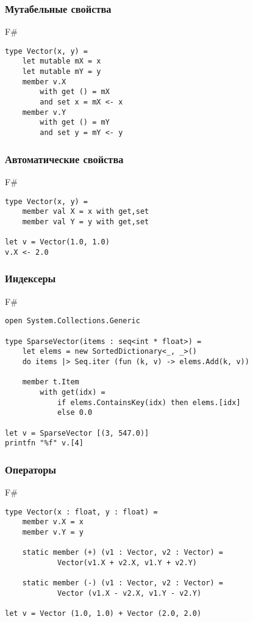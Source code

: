 \documentclass[xetex,mathserif,serif]{beamer}
\begin{document}
	\begin{frame}[fragile]
		\frametitle{Мутабельные свойства}
		\begin{exampleblock}{F\#}
			\begin{verbatim}
type Vector(x, y) = 
    let mutable mX = x
    let mutable mY = y
    member v.X 
        with get () = mX
        and set x = mX <- x
    member v.Y
        with get () = mY
        and set y = mY <- y
			\end{verbatim}
		\end{exampleblock}
\end{frame}

	\begin{frame}[fragile]
		\frametitle{Автоматические свойства}
		\begin{exampleblock}{F\#}
			\begin{verbatim}
type Vector(x, y) = 
    member val X = x with get,set
    member val Y = y with get,set

let v = Vector(1.0, 1.0)
v.X <- 2.0
			\end{verbatim}
		\end{exampleblock}
\end{frame}

	\begin{frame}[fragile]
		\frametitle{Индексеры}
		\begin{exampleblock}{F\#}
			\begin{verbatim}
open System.Collections.Generic

type SparseVector(items : seq<int * float>) =
    let elems = new SortedDictionary<_, _>()
    do items |> Seq.iter (fun (k, v) -> elems.Add(k, v))

    member t.Item
        with get(idx) =
            if elems.ContainsKey(idx) then elems.[idx]
            else 0.0

let v = SparseVector [(3, 547.0)]
printfn "%f" v.[4]
			\end{verbatim}
		\end{exampleblock}
\end{frame}

	\begin{frame}[fragile]
		\frametitle{Операторы}
		\begin{exampleblock}{F\#}
			\begin{verbatim}
type Vector(x : float, y : float) =
    member v.X = x
    member v.Y = y

    static member (+) (v1 : Vector, v2 : Vector) =
            Vector(v1.X + v2.X, v1.Y + v2.Y)

    static member (-) (v1 : Vector, v2 : Vector) =
            Vector (v1.X - v2.X, v1.Y - v2.Y)

let v = Vector (1.0, 1.0) + Vector (2.0, 2.0)
			\end{verbatim}
		\end{exampleblock}
\end{frame}
\end{document}
